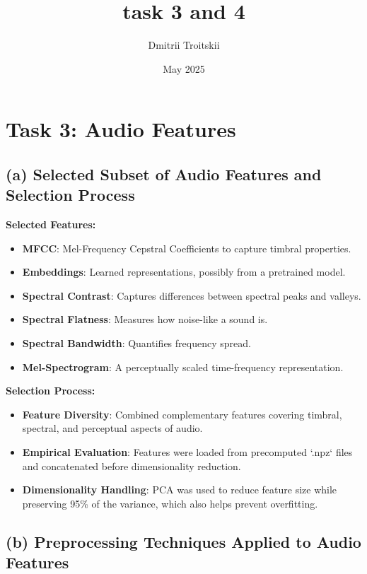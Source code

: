 \documentclass{article}
\title{task 3 and 4}
\author{Dmitrii Troitskii}
\date{May 2025}
\begin{document}
\maketitle

\section*{Task 3: Audio Features}

\subsection*{(a) Selected Subset of Audio Features and Selection Process}

\textbf{Selected Features:}
\begin{itemize}
    \item \textbf{MFCC}: Mel-Frequency Cepstral Coefficients to capture timbral properties.
    \item \textbf{Embeddings}: Learned representations, possibly from a pretrained model.
    \item \textbf{Spectral Contrast}: Captures differences between spectral peaks and valleys.
    \item \textbf{Spectral Flatness}: Measures how noise-like a sound is.
    \item \textbf{Spectral Bandwidth}: Quantifies frequency spread.
    \item \textbf{Mel-Spectrogram}: A perceptually scaled time-frequency representation.
\end{itemize}

\textbf{Selection Process:}
\begin{itemize}
    \item \textbf{Feature Diversity}: Combined complementary features covering timbral, spectral, and perceptual aspects of audio.
    \item \textbf{Empirical Evaluation}: Features were loaded from precomputed `.npz` files and concatenated before dimensionality reduction.
    \item \textbf{Dimensionality Handling}: PCA was used to reduce feature size while preserving 95\% of the variance, which also helps prevent overfitting.
\end{itemize}

\subsection*{(b) Preprocessing Techniques Applied to Audio Features}
\end{document}
